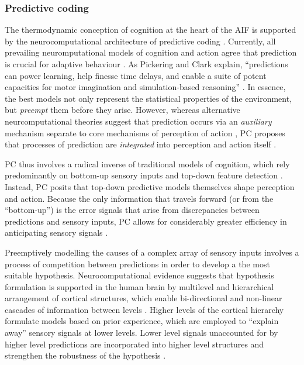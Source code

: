 \begin{CJK}{UTF8}{gbsn}
\subsubsection{Predictive coding\label{sect:predictiveCoding}}

The thermodynamic conception of cognition at the heart of the AIF is supported by the neurocomputational architecture of predictive coding  \citep[hereafter PC][]{Rao1999,Clark2013}.  Currently, all prevailing neuromputational models of cognition and action agree that prediction is crucial for adaptive behaviour \citep{Wolpert2003,Clark2013}. As Pickering and Clark explain, ``predictions can power learning, help finesse time delays, and enable a suite of potent capacities for motor imagination and simulation-based reasoning'' \citep[6]{Pickering2014}.  In essence, the best models not only represent the statistical properties of the environment, but \textit{preempt} them before they arise.  However, whereas alternative neurcomputational theories suggest that prediction occurs via an \textit{auxiliary} mechanism separate to core mechanisms of perception of action \citep{Wolpert1997}, PC proposes that processes of prediction are \textit{integrated} into perception and action itself \citep[for a more detailed review of Auxiliary Forward Models and Integrative Forward Models, see Appendix ~\ref{app2:theory}, Section ~\ref{app2:motorControl};][]{Clark2013}.

PC thus involves a radical inverse of traditional models of cognition, which rely predominantly on bottom-up sensory inputs and top-down feature detection \citep[e.g.,][]{Marr1985}. Instead, PC posits that top-down predictive models themselves shape perception and action.  Because the only information that travels forward (or from the ``bottom-up'') is the error signals that arise from discrepancies between predictions and sensory inputs, PC allows for considerably greater efficiency in anticipating sensory signals \citep[for a more detailed explanation of the PC paradigm, including its origins as a data compression strategy, see Appendix~\ref{app2:theory} Section ~\ref{app2:predictiveCoding}][]{Pickering2014}.

Preemptively modelling the causes of a complex array of sensory inputs involves a process of competition between predictions in order to develop a the most suitable hypothesis.  Neurocomputational evidence suggests that hypothesis formulation is supported in the human brain by multilevel and hierarchical arrangement of cortical structures, which enable bi-directional and non-linear cascades of information between levels \citep{Feldman2010}.  Higher levels of the cortical hierarchy formulate models based on prior experience, which are employed to ``explain away'' sensory signals at lower levels.  Lower level signals unaccounted for by higher level predictions are incorporated into higher level structures and strengthen the robustness of the hypothesis \citep{Clark2013}.


\end{CJK}
